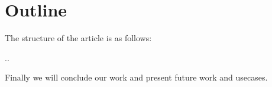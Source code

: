 



\section{Outline}

The structure of the article is as follows:

..

Finally we will conclude our work and present future work and
usecases.
